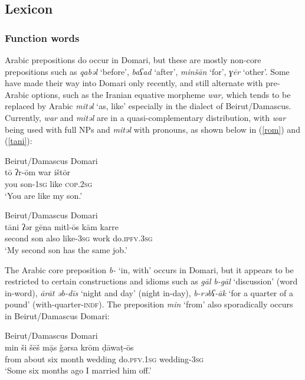 \documentclass[output=paper]{langsci/langscibook}
\begin{document}
 \subsection{Lexicon}
 \subsubsection{Function words}

Arabic prepositions do occur in Domari, but these are mostly non-core prepositions such as \textit{qabəl} ‘before’, \textit{baʕad} ‘after’, \textit{minšān} ‘for’, \textit{ɣēr} ‘other’. Some have made their way into Domari only recently, and still alternate with pre-Arabic options, such as the Iranian equative morpheme \textit{war,} which tends to be replaced by Arabic \textit{mitəl} ‘as, like’ especially in the dialect of Beirut/Damascus. Currently, \textit{war} and \textit{mitəl} are in a quasi-complementary distribution, with \textit{war} being used with full NPs and \textit{mitəl} with pronouns, as shown below in (\ref{rom}) and (\ref{tani}):

\ea
{Beirut/Damascus Domari}\\ \label{rom}
\gll tō ʔr-ōm war ištōr\\
     you son-\textsc{1sg} like \textsc{cop.2sg}\\
\glt ‘You are like my son.’
\z

\ea \label{tani}
{Beirut/Damascus Domari}\\
\gll tāni ʔər gēna mitl-ōs kām karre\\
     second son also like-\textsc{3sg} work do.\textsc{ipfv.3sg}\\
\glt ‘My second son has the same job.’
\z

The Arabic core preposition \textit{b-} ‘in, with’ occurs in Domari, but it appears to be restricted to certain constructions and idioms such as \textit{gāl} \textit{b-gāl} ‘discussion’ (word in-word), \textit{ārāt} \textit{əb-dīs} ‘night and day’ (night in-day), \textit{b-rəbʕ-āk} ‘for a quarter of a pound’ (with-quarter-\textsc{indf}). The preposition \textit{min} ‘from’ also sporadically occurs in Beirut/Damascus Domari:

\ea
{Beirut/Damascus Domari}\\
\gll min ši šēš mạ̄s ǧərsa krōm ḍāwaṭ-ōs\\
     from about six month wedding do.\textsc{pfv.1sg} wedding-\textsc{3sg}\\
\glt ‘Some six months ago I married him off.’
\z
 
\end{document}
